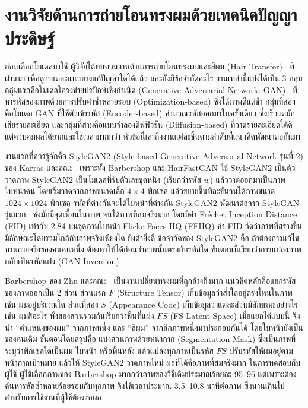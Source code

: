 
\section{งานวิจัยด้านการถ่ายโอนทรงผมด้วยเทคนิคปัญญาประดิษฐ์}

ก่อนเลือกโมเดลมาใช้ ผู้วิจัยได้ทบทวนงานด้านการถ่ายโอนทรงผมและสีผม
(Hair Transfer)~\cite{Zhu_2021,nikolaev2024hairfastganrealisticrobusthair} ที่ผ่านมา
เพื่อดูว่าแต่ละแนวทางแก้ปัญหาใดได้แล้ว และยังมีข้อจำกัดอะไร
งานเหล่านี้แบ่งได้เป็น 3 กลุ่ม กลุ่มแรกคือโมเดลโครงข่ายปรปักษ์เชิงกำเนิด
(Generative Adversarial Network: GAN)~\cite{goodfellow2014generativeadversarialnetworks}
ที่หารหัสของภาพด้วยการปรับค่าซ้ำหลายรอบ (Optimization-based) ซึ่งได้ภาพดีแต่ช้า
กลุ่มที่สองคือโมเดล GAN ที่ใช้ตัวเข้ารหัส (Encoder-based) คำนวณรหัสออกมาในครั้งเดียว ซึ่งเร็วแต่มักเสียรายละเอียด
และกลุ่มที่สามคือแบบจำลองดิฟฟิวชัน (Diffusion-based) ที่วาดรายละเอียดได้ดี แต่ควบคุมผลได้ยากและใช้เวลามากกว่า
หัวข้อนี้เล่าถึงงานแต่ละชิ้นตามลำดับที่แนวคิดพัฒนาต่อกันมา

งานแรกที่ควรรู้จักคือ StyleGAN2 (Style-based Generative Adversarial Network รุ่นที่ 2)
ของ Karras และคณะ~\cite{karras2020analyzingimprovingimagequality} เพราะทั้ง Barbershop และ HairFastGAN ใช้ StyleGAN2 เป็นตัววาดภาพ
StyleGAN2 เป็นโมเดลที่รับตัวเลขชุดหนึ่ง (เรียกว่ารหัส $w$) แล้ววาดออกมาเป็นภาพใบหน้าคน
โดยเริ่มวาดจากภาพขนาดเล็ก $4 \times 4$ พิกเซล แล้วขยายขึ้นทีละขั้นจนได้ภาพขนาด $1024 \times 1024$ พิกเซล
รหัสที่ต่างกันจะได้ใบหน้าที่ต่างกัน StyleGAN2 พัฒนาต่อจาก StyleGAN รุ่นแรก~\cite{karras2019stylebasedgeneratorarchitecturegenerative}
ซึ่งมักมีจุดเพี้ยนในภาพ จนได้ภาพที่สมจริงมาก
โดยมีค่า Fréchet Inception Distance (FID) เท่ากับ 2.84 บนชุดภาพใบหน้า Flickr-Faces-HQ (FFHQ)
ค่า FID วัดว่าภาพที่สร้างขึ้นมีลักษณะโดยรวมใกล้กับภาพจริงเพียงใด ยิ่งต่ำยิ่งดี
ข้อจำกัดของ StyleGAN2 คือ ถ้าต้องการแก้ไขภาพถ่ายจริงของคนคนหนึ่ง ต้องหาให้ได้ก่อนว่าภาพนั้นตรงกับรหัสใด
ขั้นตอนนี้เรียกว่าการแปลงภาพกลับเป็นรหัสแฝง (GAN Inversion)

Barbershop ของ Zhu และคณะ~\cite{Zhu_2021} เป็นงานเปลี่ยนทรงผมที่ถูกอ้างถึงมาก
แนวคิดหลักคือแยกรหัสของภาพออกเป็น 2 ส่วน ส่วนแรก $F$ (Structure Tensor) เก็บข้อมูลว่าสิ่งใดอยู่ตรงไหนในภาพ เช่น ผมอยู่บริเวณใด
ส่วนที่สอง $S$ (Appearance Code) เก็บข้อมูลว่าแต่ละส่วนมีลักษณะอย่างไร เช่น ผมสีอะไร
ทั้งสองส่วนรวมกันเรียกว่าพื้นที่แฝง $FS$ (FS Latent Space)
เมื่อแยกได้แบบนี้ จึงนำ ``ตำแหน่งของผม'' จากภาพหนึ่ง และ ``สีผม'' จากอีกภาพหนึ่งมาประกอบกันได้
โดยใบหน้ายังเป็นของคนเดิม
ขั้นตอนโดยสรุปคือ แบ่งส่วนภาพด้วยหน้ากาก (Segmentation Mask)
ซึ่งเป็นภาพที่ระบุว่าพิกเซลใดเป็นผม ใบหน้า หรือพื้นหลัง แล้วแปลงทุกภาพเป็นรหัส $FS$
ปรับรหัสให้ผมอยู่ตามหน้ากากเป้าหมาย แล้วให้ StyleGAN2 วาดภาพใหม่
ผลที่ได้คือภาพที่สมจริงมาก ในการทดสอบกับผู้ใช้ ผู้ใช้เลือกภาพของ Barbershop มากกว่าภาพของวิธีเดิมประมาณร้อยละ 95--96
แต่เพราะต้องค้นหารหัสซ้ำหลายร้อยรอบกับทุกภาพ จึงใช้เวลาประมาณ 3.5--10.8 นาทีต่อภาพ
ซึ่งนานเกินไปสำหรับการใช้งานที่ผู้ใช้ต้องรอผล

